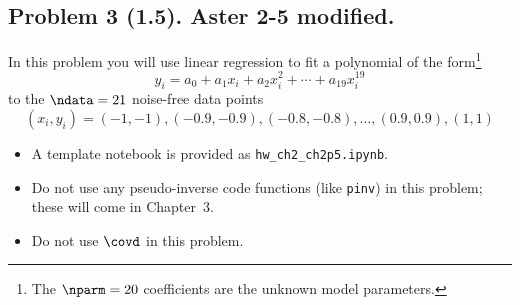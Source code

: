 \documentclass[11pt,titlepage,fleqn]{article}
\newcommand{\tfileB}{{\tt hw\_ch2\_ch2p5.ipynb}}
\begin{document}

\subsection*{Problem 3 (1.5). Aster 2-5 modified.}

In this problem you will use linear regression to fit a polynomial of the form\footnote{The $\nparm = 20$ coefficients are the unknown model parameters.}
%
\begin{equation}
y_i = a_0 + a_1x_i + a_2x_i^2 + \cdots + a_{19}x_i^{19}
\label{yi}
\end{equation}
%
to the $\ndata=21$ noise-free data points
%
\begin{equation*}
(x_i,y_i) = (-1,-1), (-0.9,-0.9), (-0.8,-0.8), \ldots, (0.9,0.9), (1,1)
\end{equation*}
%
\begin{itemize}
\item A template notebook is provided as \tfileB.

\item Do not use any pseudo-inverse code functions (like \verb+pinv+) in this problem; these will come in Chapter~3.

\item Do not use $\covd$ in this problem.
\end{itemize}

\end{document}
